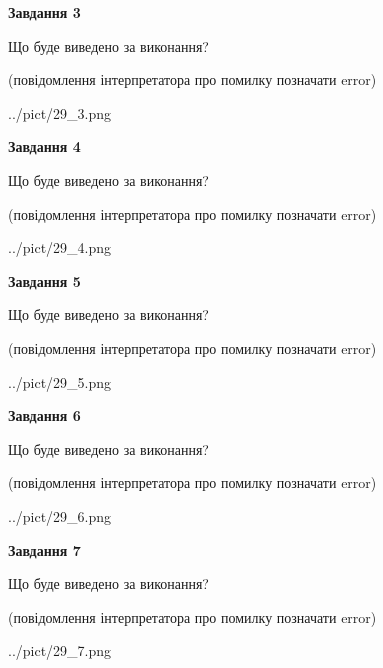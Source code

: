 \documentclass[12pt, ukrainian]{article}
\begin{document}
{\begin {large}
{\begin {center}\textbf{Завдання 3}\end {center}}\par
Що буде виведено за виконання?\par
 (повідомлення інтерпретатора про помилку позначати error)\par
\begin{center}
	{../pict/29_3.png}
\end{center}
\newpage

{\begin {center}\textbf{Завдання 4}\end {center}}\par
Що буде виведено за виконання?\par
 (повідомлення інтерпретатора про помилку позначати error)\par
\begin{center}
	{../pict/29_4.png}
\end{center}
\newpage

{\begin {center}\textbf{Завдання 5}\end {center}}\par
Що буде виведено за виконання?\par
 (повідомлення інтерпретатора про помилку позначати error)\par
\begin{center}
	{../pict/29_5.png}
\end{center}
\newpage

{\begin {center}\textbf{Завдання 6}\end {center}}\par
Що буде виведено за виконання?\par
 (повідомлення інтерпретатора про помилку позначати error)\par
\begin{center}
	{../pict/29_6.png}
\end{center}
\newpage

{\begin {center}\textbf{Завдання 7}\end {center}}\par
Що буде виведено за виконання?\par
 (повідомлення інтерпретатора про помилку позначати error)\par
\begin{center}
	{../pict/29_7.png}
\end{center}
\newpage


\end{large}}
\end{document}
